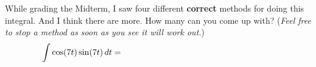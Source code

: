 While grading the Midterm, I saw four different \textbf{correct} methods for doing this integral.  And I think there are more.  How many can you come up with?  (\emph{Feel free to stop a method as soon as you see it will work out.})
  $$\int \cos(7t) \sin(7t)\,dt = \hspace{2.5in}$$